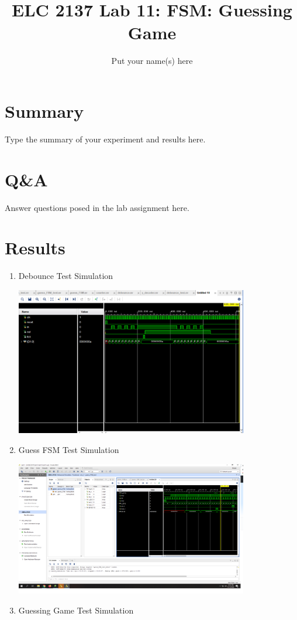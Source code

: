 \documentclass[11pt]{article}
\begin{document}
\title{ELC 2137 Lab 11: FSM: Guessing Game}
\author{Put your name(s) here}

\maketitle


\section*{Summary}

Type the summary of your experiment and results here.  


\section*{Q\&A}

Answer questions posed in the lab assignment here.


\section*{Results}

\begin{enumerate}
	
	\item Debounce Test Simulation
	
	\includegraphics[width=0.8\textwidth]{debounce_sc.PNG}
	
	\item Guess FSM Test Simulation 
	
	\includegraphics[width=0.8\textwidth]{guess_FSM_sh.PNG}
	
	\item Guessing Game Test Simulation 
	

\end{enumerate}
\end{document}
